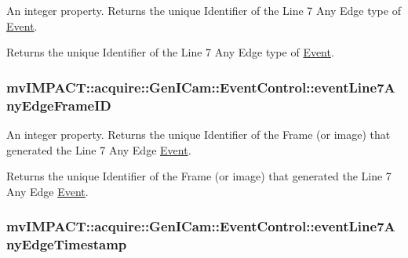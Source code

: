 An integer property. Returns the unique Identifier of the Line 7 Any Edge type of \hyperlink{classmv_i_m_p_a_c_t_1_1acquire_1_1_event}{Event}. 

Returns the unique Identifier of the Line 7 Any Edge type of \hyperlink{classmv_i_m_p_a_c_t_1_1acquire_1_1_event}{Event}. \hypertarget{classmv_i_m_p_a_c_t_1_1acquire_1_1_gen_i_cam_1_1_event_control_a79f57dcc3af6ee6132b6bd3a9e9b29a9}{
\subsubsection[{event\+Line7\+Any\+Edge\+Frame\+I\+D}]{ mv\+I\+M\+P\+A\+C\+T\+::acquire\+::\+Gen\+I\+Cam\+::\+Event\+Control\+::event\+Line7\+Any\+Edge\+Frame\+I\+D}}\label{classmv_i_m_p_a_c_t_1_1acquire_1_1_gen_i_cam_1_1_event_control_a79f57dcc3af6ee6132b6bd3a9e9b29a9}


An integer property. Returns the unique Identifier of the Frame (or image) that generated the Line 7 Any Edge \hyperlink{classmv_i_m_p_a_c_t_1_1acquire_1_1_event}{Event}. 

Returns the unique Identifier of the Frame (or image) that generated the Line 7 Any Edge \hyperlink{classmv_i_m_p_a_c_t_1_1acquire_1_1_event}{Event}. \hypertarget{classmv_i_m_p_a_c_t_1_1acquire_1_1_gen_i_cam_1_1_event_control_a331885b23e26f654ac61fe2c0db77061}{
\subsubsection[{event\+Line7\+Any\+Edge\+Timestamp}]{ mv\+I\+M\+P\+A\+C\+T\+::acquire\+::\+Gen\+I\+Cam\+::\+Event\+Control\+::event\+Line7\+Any\+Edge\+Timestamp}}\label{classmv_i_m_p_a_c_t_1_1acquire_1_1_gen_i_cam_1_1_event_control_a331885b23e26f654ac61fe2c0db77061}


